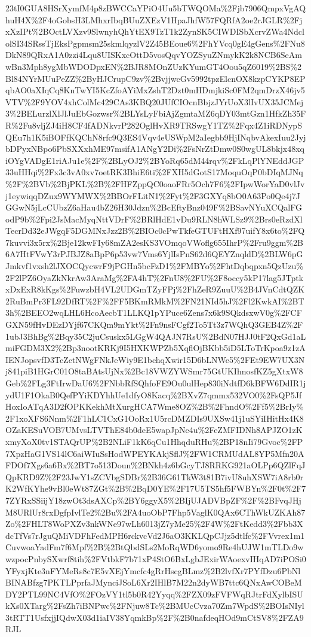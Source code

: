 \documentclass[11pt]{article}
\begin{document}
23tI0GUA8HSrXymfM4p8zBWCCaYPiO4Uu5bTWQOMa\%2Fjb7906QmpxVgAQhuH4X\%2F4oGobsH3LMhxrIbqBUuZXEzV1HpaJhfW57FQRfA2oe2rJGLR\%2FjxXzIPt\%2BOctLVXzv9SlwnyhQhYtEX9TzT1k2ZynSK5CIWDISbXcrvZWa4NdclolSI34SRssTjEksPgpmsm25skmlqyzlV2Z45BEoue6\%2FhYVcq0gE4gGens\%2FNu8DkN89QRxA1A0zzi4Lqu8UISKxcOttD5vosQqvYOZSyuZNmykK2k8NCB6SeAmwBn3Mph8ygMbWDODpxEN\%2BJR8MOnZUzKYumGT4Oou5qZ6019\%2BS\%2Bl84NYrMUuPeZZ\%2ByHJCrupC9zv\%2BvjjwcGv5992tpzElcnOX8kzpCYKP8EPqbAO0aXIqCq8KnTwYI5KcZfoAYiMxZshT2Dzt0mHDmjkiSc0FM2qmDrzX46jv5VTV\%2F9YOV4xhColMc429CAs3KBQ20JUfCIOcnBbjzJYrUoX3lIvUX35JCMej3\%2BELurzlXlJlJuEbGozwsr\%2BLYsLyFbiAjZgmtaMZ6qDY03mtGzn1HfkZh35FR\%2Fu8vljZJ4iH8CF4fADNkvrP282OglHvXR9TRSwgY1TZ\%2Fqx4Z1iRDNypSQEu7h1K5iBOFfKQChN8rfc9Q3ES4Vqv4eUSWpM2aIegbb9HjINqbvAkexIuu2JyjbDPyxNBpo6PbSXXxhME97msifA1ANgY2Di\%2FsNrZtDmw0S0wgUL8bkjx48xqiOYgVADgE1riAJu1e\%2F\%2BLyOJ2\%2BYoRq65dM44rqv\%2FkLqPlYNEddJGP33uHHqi\%2Fx3c3vA0xv7oetRK3BhiE6ti\%2FXH5dGotS17MoquOqP0bDIqMJNq\%2F\%2BVb\%2BjPKL\%2B\%2FHFZppQC0oaoFRr5Och7F6\%2FIpwWorYaD0vlJvj1eywiqqDZux9WYMWX\%2BBOrFLitN1\%2Fyt\%2F3GXYq8bO0A63Po0Qe4j7JGGwN5jLcCUbzZ6aHau4bZ26H30Jdzn\%2BcEftyBnz049F\%2BSavNYuXCQalFGodP9b\%2Fpi2JsMacMyqNttVDrF\%2BRlHdE1vDu9RLN8hWLSz9\%2Brs0eRzdXlTecrDd32eJWgqF5DGMNxJzz2B\%2BIOc0cPwTkfeGTUFtHXf97uifY8x6to\%2FQ7kuvvi3x5rx\%2Bje12kwFIy68mZA2esKS3VOmqoVWoflg655IhrP\%2Fru9ggm\%2B6A7HtFVwY3rPJBJZ8aBpP6p53vw7Vms6YjlIsPnS62d6QEYZnqldD\%2BLW6pGJmkvf1vxsh2lJXOCQycwrF9jPGHn5bcFzD1\%2FMBYo\%2FhtDqbqpxn5QzUzu\%2F2lPZ6OyaZkNkrAw3AraMg\%2FA4hT\%2FnU8\%2FU\%2F8occy5kP17lag5JTptkxDxExR8kKgs\%2FuwzbH4VL2UDGmTZyFPj\%2FhZeR9ZuuU\%2B4JVnCdtQZK2RuBmPr3FL92DfRT\%2F\%2FF5BKmRMkM\%2FN21NId5hJ\%2Fl2KwkAI\%2BT3h\%2BEEO2wqLHL6HcoAecbT1LLKQ1pYPuce6Zens7x6k9SQkdsxwV0g\%2FCFGXN59fHvDEzDYjf67CKQm9mYkt\%2Fn9nsFCgf2To5Tt3z7WQhQ3GEB4Z\%2F1ubJ3BhBg\%2Bqy35C2juCsuskx5LGgW4QAJN7RsU\%2BdN07HJJ0tF2QxGd1aLmiFGDM3X2\%2Bp3nootKRKj9I5HXKWPZb5XqflOjBKbb5iD5LToTrKpoa9z1zAIENJopsvfD3TcZctNWgFNkJeWiy9E1bchqXwir15D6bLNWe5\%2FEt9EW7UX3Nj841piB1HGrC01O8taBAtsUjNx\%2Bc18VWZYWSmr75GtUKIhnosfKZ5gXtxW8Geb\%2FLg3FtIrwDaU6\%2FNbbRfSQhfoFE9Ou0ulHep830iNdtfD6kBFW6DdIR1jydU1F1OkaB0QefPYiKDYhhUe1dfyO8Kacq\%2BXvZ7qmmx532VO0\%2FsQP5JfHoxIoATqA3D2fOPKKekhMtXurgHCA7Wme8OZ\%2B\%2FhndO\%2Ff5\%2BrIy\%2F1xoXFS6Nnm\%2F1hLC1CxG1OoRx1U5rcDMZDIs9UXSw41j1uSYiIHitHx4K8OZaKESuVOB7UMvsLTVThE84b0deE5wapJpNe4u\%2FeZMFIDNh8APJZO1zKxmyXoX0tv1STAQrUP\%2B2NLiF1kK6qCu1HhqduRHu\%2BP18nIi79Gvoc\%2FP7XpzHaG1VS14lC6aiWIuSsHodWPEYKAkjSflJ\%2FW1CRMUdAL8YP5Mfn20AFDOf7Xgs6a6Bx\%2BT7o513Doun\%2BNkh4z6bGcyTJ8RRKG921aOLPp6QZlFqJQpKRD9Z\%2F23JwY1sZCVbgSDBr\%2B36G61TkW3t81B7ivU8uhXSW7iA8rb0rK2WfKYhe9vBl0eWt87ZGt\%2B\%2BqD0YE\%2F17U5TS5hf5FWBYn\%2F0t\%2F77ZYRxSSiijY18zwOt3dsAXCp\%2BY6ggyX5\%2BIjUJADVBpZF\%2F\%2BFvqJHjM8URlUr8rxDgfpIvlTe2\%2Bu\%2FA4uoObP7Fhp5VaglK0QAx6CThWkUZKAh87Zo\%2FHLT8WoPXZv3nkWNe97wLh6013jZ7yMe25\%2F4W\%2FtKedd3\%2Fbb3XdcTfVs7rJguQMiVDFhFedMPH6rckvcVd2J6aO3KKLQpCJjz5dtlfc\%2FVvrex1m1CuvwoaYadFm7f6Mpf\%2B\%2BtQbdSLs2MoRqWD6yomo9Re4hUJW1mTLDo9wwzpocPnbySXwrf8tih\%2FVtbkF7b71xP4StO6BxLgbJExirWAoexvIHqAD7iPOSi0YFyxjKte3nFYMeRs8c7E5vXEjYmcfc4gRrHscgBLmz\%2B2lvfXr7PYfDzu6PbNlBINABfzg7PKTLPprfaJMynciJSoL6Xr2IHlB7M22n2dyWB7ttc6QNxAwCOBeMDY2PTL99NC4VfO\%2FOzVY1tl5b0R42Yyqq\%2FZX09zFVFWqRJtrFdXylbISUkXs0XTarg\%2FsZh7iBNPwc\%2FNjuw8Tc\%2BMUcCvza70Zm7WpdS\%2BOIsNIyl3tRTT1UsfxjjIQdwX03d1iaIV38YqmkBp\%2F\%2B0nafdeqHOd9mCtSV8\%2FZA9RJL
\end{document}
